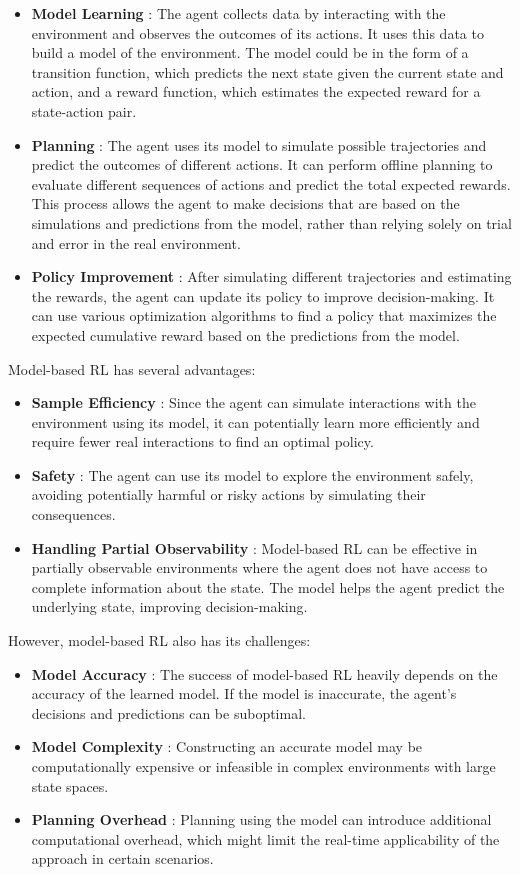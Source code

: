 \begin{itemize}
    \item \textbf{Model Learning} : The agent collects data by interacting with the environment and observes the outcomes of its actions. It uses this data to build a model of the environment. The model could be in the form of a transition function, which predicts the next state given the current state and action, and a reward function, which estimates the expected reward for a state-action pair.
    \item \textbf{Planning} : The agent uses its model to simulate possible trajectories and predict the outcomes of different actions. It can perform offline planning to evaluate different sequences of actions and predict the total expected rewards. This process allows the agent to make decisions that are based on the simulations and predictions from the model, rather than relying solely on trial and error in the real environment.
    \item \textbf{Policy Improvement} : After simulating different trajectories and estimating the rewards, the agent can update its policy to improve decision-making. It can use various optimization algorithms to find a policy that maximizes the expected cumulative reward based on the predictions from the model.
\end{itemize}

Model-based RL has several advantages:

\begin{itemize}
    \item \textbf{Sample Efficiency} : Since the agent can simulate interactions with the environment using its model, it can potentially learn more efficiently and require fewer real interactions to find an optimal policy.
    \item \textbf{Safety} : The agent can use its model to explore the environment safely, avoiding potentially harmful or risky actions by simulating their consequences.
    \item \textbf{Handling Partial Observability} : Model-based RL can be effective in partially observable environments where the agent does not have access to complete information about the state. The model helps the agent predict the underlying state, improving decision-making.
\end{itemize}

However, model-based RL also has its challenges:

\begin{itemize}
    \item \textbf{Model Accuracy} : The success of model-based RL heavily depends on the accuracy of the learned model. If the model is inaccurate, the agent's decisions and predictions can be suboptimal.
    \item \textbf{Model Complexity} : Constructing an accurate model may be computationally expensive or infeasible in complex environments with large state spaces.
    \item \textbf{Planning Overhead} : Planning using the model can introduce additional computational overhead, which might limit the real-time applicability of the approach in certain scenarios.
\end{itemize}

